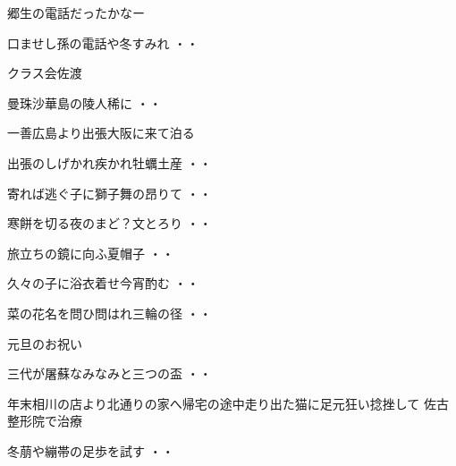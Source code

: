 \vspace{0.6cm}
郷生の電話だったかなー
\begin{shiika}口ませし孫の電話や冬すみれ
\hfill{・・}\end{shiika}
\vspace{0.6cm}
クラス会佐渡
\begin{shiika}曼珠沙華島の陵人稀に
\hfill{・・}\end{shiika}
\vspace{0.6cm}
一善広島より出張大阪に来て泊る
\begin{shiika}出張のしげかれ疾かれ牡蠣土産
\hfill{・・}\end{shiika}
\begin{shiika}寄れば逃ぐ子に獅子舞の昂りて
\hfill{・・}\end{shiika}
\begin{shiika}寒餅を切る夜のまど？文とろり
\hfill{・・}\end{shiika}
\begin{shiika}旅立ちの鏡に向ふ夏帽子
\hfill{・・}\end{shiika}
\begin{shiika}久々の子に浴衣着せ今宵酌む
\hfill{・・}\end{shiika}
\begin{shiika}菜の花名を問ひ問はれ三輪の径
\hfill{・・}\end{shiika}
\vspace{0.6cm}
元旦のお祝い
\begin{shiika}三代が屠蘇なみなみと三つの盃
\hfill{・・}\end{shiika}
\vspace{0.6cm}
年末相川の店より北通りの家へ帰宅の途中走り出た猫に足元狂い捻挫して
佐古整形院で治療
\begin{shiika}冬萠や繃帯の足歩を試す
\hfill{・・}\end{shiika}
\vspace{0.6cm}

